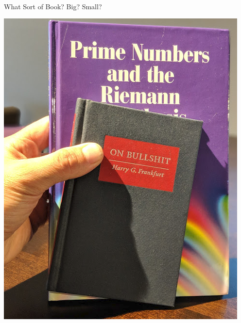 \documentclass{beamer}
\begin{document}
\begin{frame}{What Sort of Book?  Big? Small?}
\begin{center}
    \includegraphics[height=.75\textheight]{pics/bullshit}
  \end{center}
\end{frame}
\end{document}
